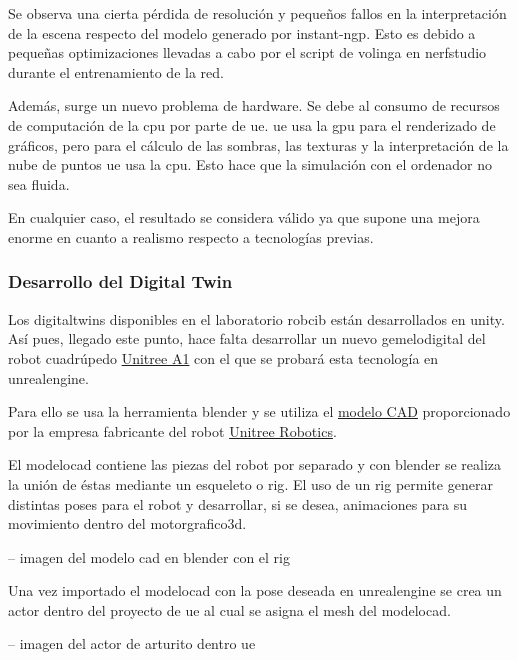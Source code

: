 \documentclass[a4paper, 12pt, spanish, twoside]{article}
\begin{document}
Se observa una cierta pérdida de resolución y pequeños fallos en la interpretación de la escena respecto del modelo generado por \gls{instant-ngp}. Esto es debido a pequeñas optimizaciones llevadas a cabo por el script de \gls{volinga} en \gls{nerfstudio} durante el entrenamiento de la red.  

Además, surge un nuevo problema de \gls{hardware}. Se debe al consumo de recursos de computación de la \acrshort{cpu} por parte de \acrshort{ue}. \acrshort{ue} usa la \acrshort{gpu} para el renderizado de gráficos, pero para el cálculo de las sombras, las texturas y la interpretación de la nube de puntos \acrshort{ue} usa la \acrshort{cpu}. Esto hace que la simulación con el ordenador no sea fluida. 

En cualquier caso, el resultado se considera válido ya que supone una mejora enorme en cuanto a realismo respecto a tecnologías previas. 

\subsubsection{Desarrollo del Digital Twin} \label{sec:implementacion:nerfstudio-volinga:desarrollo}

Los \glspl{digitaltwin} disponibles en el laboratorio \acrshort{robcib} están desarrollados en \gls{unity}. Así pues, llegado este punto, hace falta desarrollar un nuevo \gls{gemelodigital} del robot cuadrúpedo \href{https://www.unitree.com/a1/}{Unitree A1} con el que se probará esta tecnología en \gls{unrealengine}. 

Para ello se usa la herramienta \gls{blender} y se utiliza el \href{https://github.com/unitreerobotics/unitree_cad/tree/main/a1}{modelo CAD} proporcionado por la empresa fabricante del robot \href{https://www.unitree.com/}{Unitree Robotics}.  

El \gls{modelocad} contiene las piezas del robot por separado y con \gls{blender} se realiza la unión de éstas mediante un esqueleto o \gls{rig}. El uso de un \gls{rig} permite generar distintas poses para el robot y desarrollar, si se desea, animaciones para su movimiento dentro del \gls{motorgrafico3d}. 

-- imagen del modelo cad en blender con el rig 

Una vez importado el \gls{modelocad} con la pose deseada en \gls{unrealengine} se crea un \gls{actor} dentro del proyecto de \acrshort{ue} al cual se asigna el \gls{mesh} del \gls{modelocad}.  

-- imagen del actor de arturito dentro ue 
\end{document}
